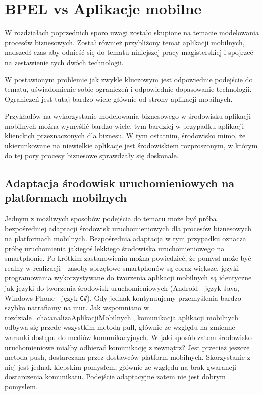 \chapter{BPEL vs Aplikacje mobilne}
\label{cha:bpelVSmobileApp}

W rozdziałach poprzednich sporo uwagi zostało skupione na temacie modelowania procesów biznesowych. Został również przybliżony temat aplikacji mobilnych, nadszedł czas aby odnieść się do tematu niniejszej pracy magisterskiej i spojrzeć na zestawienie  tych dwóch technologii. 

W postawionym problemie jak zwykle kluczowym jest odpowiednie podejście do tematu, uświadomienie sobie ograniczeń i odpowiednie dopasowanie technologii. Ograniczeń jest tutaj bardzo wiele głównie od strony aplikacji mobilnych.

 Przykładów na wykorzystanie modelowania biznesowego w środowisku aplikacji mobilnych można wymyślić bardzo wiele, tym bardziej w przypadku aplikacji klienckich przeznaczonych dla biznesu. W tym ostatnim, środowisko mimo, że ukierunkowane na niewielkie aplikacje jest środowiskiem rozproszonym, w którym do tej pory procesy biznesowe sprawdzały się doskonale. 

\section{Adaptacja środowisk uruchomieniowych na platformach mobilnych}
\label{sec:adaptacjaProcesówNaPlatformyMobilne}

Jednym z możliwych sposobów podejścia do tematu może być próba bezpośredniej adaptacji środowisk uruchomieniowych dla procesów biznesowych na platformach mobilnych. Bezpośrednia adaptacja w tym przypadku oznacza próbę uruchomienia jakiegoś lekkiego środowiska uruchomieniowego na smartphonie. Po krótkim zastanowieniu można powiedzieć, że pomysł może być realny w realizacji - zasoby sprzętowe smartphonów są coraz większe, języki programowania wykorzystywane do tworzenia aplikacji mobilnych są identyczne jak języki do tworzenia środowisk uruchomieniowych (Android - język Java, Windows Phone - język \texttt{C\#}). Gdy jednak kontynuujemy przemyślenia bardzo szybko natrafiamy na mur. Jak wspomniano w rozdziale~\ref{cha:analizaAplikacjiMobilnych}, komunikacja aplikacji mobilnych odbywa się przede wszystkim metodą pull, głównie ze względu na zmienne warunki dostępu do mediów komunikacyjnych. W jaki sposób zatem środowisko uruchomieniowe miałby odbierać komunikację z zewnątrz? Jest przecież jeszcze metoda push, dostarczana przez dostawców platform mobilnych. Skorzystanie z niej jest jednak kiepskim pomysłem, głównie ze względu na brak gwarancji dostarczenia komunikatu. Podejście adaptacyjne zatem nie jest dobrym pomysłem. 

